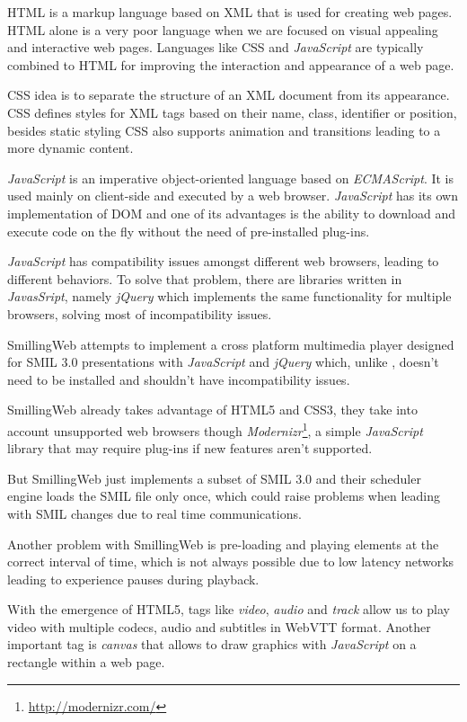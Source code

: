   \ac{HTML} is a markup language based on \ac{XML} that is used for creating web pages. \ac{HTML} alone is a very poor language when we are focused on visual appealing and interactive web pages. Languages like \ac{CSS} and \emph{JavaScript} are typically combined to \ac{HTML} for improving the interaction and appearance of a web page. 

  \ac{CSS} idea is to separate the structure of an \ac{XML} document from its appearance. \ac{CSS} defines styles for \ac{XML} tags based on their name, class, identifier or position, besides static styling \ac{CSS} also supports animation and transitions leading to a more dynamic content.

  \emph{JavaScript} is an imperative object-oriented language based on \emph{ECMAScript}. It is used mainly on client-side and executed by a web browser. \emph{JavaScript} has its own implementation of \ac{DOM} and one of its advantages is the ability to download and execute code on the fly without the need of pre-installed plug-ins.

  \emph{JavaScript} has compatibility issues amongst different web browsers, leading to different behaviors. To solve that problem, there are libraries written in \emph{JavasSript}, namely \emph{jQuery} which implements the same functionality for multiple browsers, solving most of incompatibility issues.

  SmillingWeb \cite{smillingweb} attempts to implement a cross platform multimedia player designed for \ac{SMIL} 3.0 presentations with \emph{JavaScript} and \emph{jQuery} which, unlike \cite{ambulant}, doesn't need to be installed and shouldn't have incompatibility issues. 

  SmillingWeb already takes advantage of \ac{HTML}5 and \ac{CSS}3, they take into account unsupported web browsers though \emph{Modernizr}\footnote{\url{http://modernizr.com/}}, a simple \emph{JavaScript} library that may require plug-ins if new features aren't supported.  

  But SmillingWeb just implements a subset of \ac{SMIL} 3.0 and their scheduler engine loads the \ac{SMIL} file only once, which could raise problems when leading with \ac{SMIL} changes due to real time communications.

  Another problem with SmillingWeb is pre-loading and playing elements at the correct interval of time, which is not always possible due to low latency networks leading to experience pauses during playback.

  With the emergence of \ac{HTML}5, tags like \emph{video}, \emph{audio} and \emph{track} allow us to play video with multiple codecs, audio and subtitles in \ac{WebVTT} format. Another important tag is \emph{canvas} that allows to draw graphics with \emph{JavaScript} on a rectangle within a web page.

